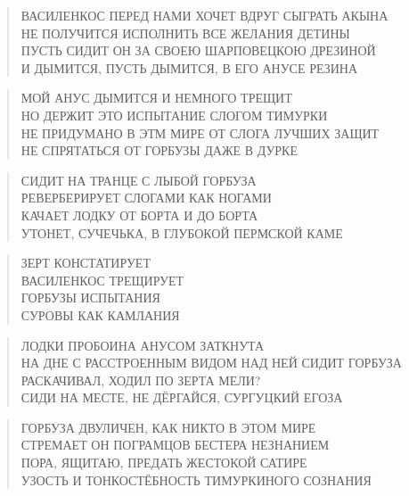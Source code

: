 \poemtitle{***}
\begin{verse}
ВАСИЛЕНКОС ПЕРЕД НАМИ ХОЧЕТ ВДРУГ СЫГРАТЬ АКЫНА\\
НЕ ПОЛУЧИТСЯ ИСПОЛНИТЬ ВСЕ ЖЕЛАНИЯ ДЕТИНЫ\\
ПУСТЬ СИДИТ ОН ЗА СВОЕЮ ШАРПОВЕЦКОЮ ДРЕЗИНОЙ\\
И ДЫМИТСЯ, ПУСТЬ ДЫМИТСЯ, В ЕГО АНУСЕ РЕЗИНА
\end{verse}

\poemtitle{***}
\begin{verse}
МОЙ АНУС ДЫМИТСЯ И НЕМНОГО ТРЕЩИТ\\
НО ДЕРЖИТ ЭТО ИСПЫТАНИЕ СЛОГОМ ТИМУРКИ\\
НЕ ПРИДУМАНО В ЭТМ МИРЕ ОТ СЛОГА ЛУЧШИХ ЗАЩИТ\\
НЕ СПРЯТАТЬСЯ ОТ ГОРБУЗЫ ДАЖЕ В ДУРКЕ
\end{verse}

\poemtitle{***}
\begin{verse}
СИДИТ НА ТРАНЦЕ С ЛЫБОЙ ГОРБУЗА\\
РЕВЕРБЕРИРУЕТ СЛОГАМИ КАК НОГАМИ\\
КАЧАЕТ ЛОДКУ ОТ БОРТА И ДО БОРТА\\
УТОНЕТ, СУЧЕЧЬКА, В ГЛУБОКОЙ ПЕРМСКОЙ КАМЕ
\end{verse}

\poemtitle{***}
\begin{verse}
ЗЕРТ КОНСТАТИРУЕТ\\
ВАСИЛЕНКОС ТРЕЩИРУЕТ\\
ГОРБУЗЫ ИСПЫТАНИЯ\\
СУРОВЫ КАК КАМЛАНИЯ
\end{verse}

\poemtitle{***}
\begin{verse}
ЛОДКИ ПРОБОИНА АНУСОМ ЗАТКНУТА\\
НА ДНЕ С РАССТРОЕННЫМ ВИДОМ НАД НЕЙ СИДИТ ГОРБУЗА\\
РАСКАЧИВАЛ, ХОДИЛ ПО ЗЕРТА МЕЛИ?\\
СИДИ НА МЕСТЕ, НЕ ДЁРГАЙСЯ, СУРГУЦКИЙ ЕГОЗА
\end{verse}

\poemtitle{***}
\begin{verse}
ГОРБУЗА ДВУЛИЧЕН, КАК НИКТО В ЭТОМ МИРЕ\\
СТРЕМАЕТ ОН ПОГРАМЦОВ БЕСТЕРА НЕЗНАНИЕМ\\
ПОРА, ЯЩИТАЮ, ПРЕДАТЬ ЖЕСТОКОЙ САТИРЕ\\
УЗОСТЬ И ТОНКОСТЁБНОСТЬ ТИМУРКИНОГО СОЗНАНИЯ
\end{verse}

